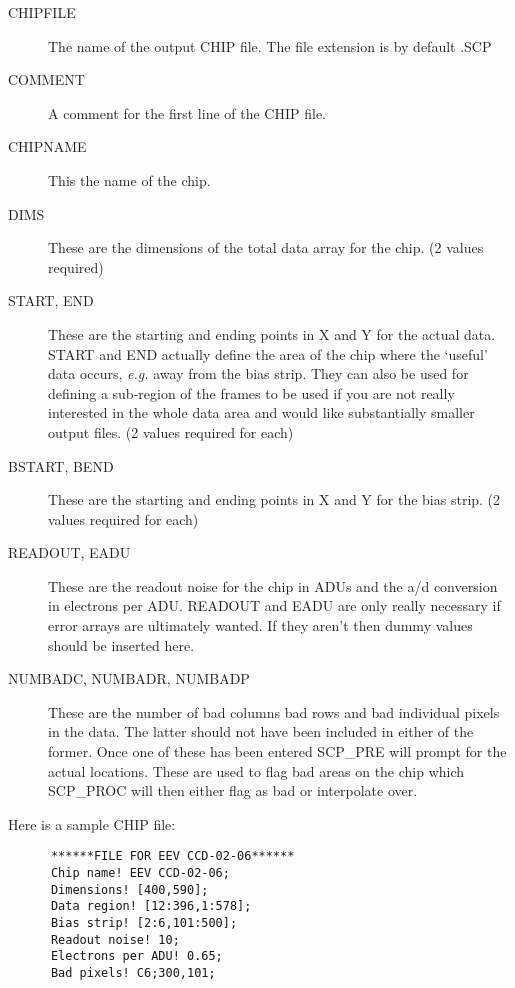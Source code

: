 \begin{description}

\item [CHIPFILE] The name of the output CHIP file. The file extension is
by default .SCP

\item [COMMENT] A comment for the first line of the CHIP file.

\item [CHIPNAME] This the name of the chip.

\item [DIMS] These are the dimensions of the total data array for the chip.
(2 values required)

\item [START, END] These are the starting and ending  points in X and Y for
the actual data. START and END actually define the area of the chip
where the `useful' data occurs, {\it e.g.} away from the bias strip.  They
can also be used for defining a sub-region of the frames to be used if you
are not really interested in the whole data area and would like substantially
smaller output files. (2 values required for each)

\item [BSTART, BEND]  These are the starting and ending points in X and Y  for
the bias strip.  (2 values required for each)

\item [READOUT, EADU] These are the readout noise for the chip in ADUs and the
a/d conversion in electrons per ADU.  READOUT and EADU are only really
necessary if error arrays are ultimately wanted.  If they aren't then dummy
values should be inserted here.

\item [NUMBADC, NUMBADR, NUMBADP] These are the number of bad columns bad rows
and bad individual pixels in the data.  The latter should not have been
included in either of the former.  Once one of these has been entered SCP\_PRE
will prompt for the actual locations. These are used to flag bad areas on the
chip which SCP\_PROC will then either flag as bad or interpolate over.

\end{description}

Here is a sample CHIP file:

\begin{verbatim}
      ******FILE FOR EEV CCD-02-06******
      Chip name! EEV CCD-02-06;
      Dimensions! [400,590];
      Data region! [12:396,1:578];
      Bias strip! [2:6,101:500];
      Readout noise! 10;
      Electrons per ADU! 0.65;
      Bad pixels! C6;300,101;
\end{verbatim}


